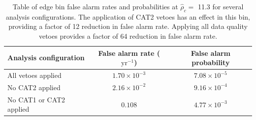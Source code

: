 \begin{table}[!ht]%
  \begin{center}
    \begin{tabular}{lcc}
      \hline
      Analysis configuration & False alarm rate ($\mathrm{yr}^{-1}$) & False alarm probability \\ \hline
      All vetoes applied & $1.70\times10^{-3}$  & $7.08\times10^{-5}$ \\
      No CAT2 applied & $2.16\times10^{-2}$ & $9.16\times10^{-4}$ \\
      No CAT1 or CAT2 applied & $0.108$ & $4.77\times10^{-3}$ \\ \hline
    \end{tabular}
  \end{center}
  \caption[Edge bin FAR - GW151226 analysis]{Table of edge bin false alarm rates and probabilities at $\hat{\rho}_{c} =$ 11.3 %
           for several analysis configurations. The application of CAT2 vetoes %
           has an effect in this bin, providing a factor of 12 reduction in false %
           alarm rate. Applying all data quality vetoes provides a factor of 64 %
           reduction in false alarm rate.}
  \label{table:151226-edge-far}
\end{table}


